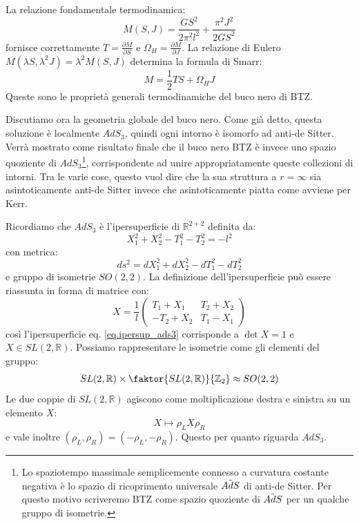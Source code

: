 La relazione fondamentale termodinamica:
\begin{equation}
    M(S,J) = \frac{G S^2}{2\pi^2l^2} + \frac{\pi^2 J^2}{2GS^2}
    \label{eq.rel_fondam_btz}
\end{equation}
fornisce correttamente $T = \frac{\partial M}{\partial S}$ e $\Omega_H = \frac{\partial M}{\partial J}$. La relazione di Eulero $M(\lambda S, \lambda^2 J)=\lambda^2 M(S,J)$ determina la formula di Smarr:
\begin{equation}
    M = \frac{1}{2}TS + \Omega_H J
    \label{eq.smarr_btz}
\end{equation}
Queste sono le proprietà generali termodinamiche del buco nero di BTZ.

Discutiamo ora la geometria globale del buco nero. Come già detto, questa soluzione è localmente $AdS_3$, quindi ogni intorno è isomorfo ad anti-de Sitter. Verrà mostrato come risultato finale che il buco nero BTZ è invece uno spazio quoziente di $AdS_3$\footnote{Lo spaziotempo massimale semplicemente connesso a curvatura costante negativa è lo spazio di ricoprimento universale $\Tilde{AdS}$ di anti-de Sitter. Per questo motivo scriveremo BTZ come spazio quoziente di $\Tilde{AdS}$  per un qualche gruppo di isometrie.}, corrispondente ad unire appropriatamente queste collezioni di intorni.
Tra le varie cose, questo vuol dire che la sua struttura a $r=\infty$ sia asintoticamente anti-de Sitter invece che asintoticamente piatta come avviene per Kerr.

Ricordiamo che $AdS_3$ è l'ipersuperficie di $\mathbb R^{2+2}$ definita da:
\begin{equation}
    X_1^2 + X_2^2 - T_1^2 -T_2^2 = -l^2
    \label{eq.ipersup_ads3}
\end{equation}
con metrica:
\begin{equation*}
    ds^2 = dX_1^2 + dX_2^2 - dT_1^2 - dT_2^2
\end{equation*}
e gruppo di isometrie $SO(2,2)$. La definizione dell'ipersuperficie può essere riassunta in forma di matrice con:
\begin{equation*}
    X = \frac{1}{l}\begin{pmatrix}
        T_1 + X_1 & T_2 + X_2 \\
        -T_2 + X_2 & T_1 - X_1
    \end{pmatrix}
\end{equation*}
così l'ipersuperficie eq. \ref{eq.ipersup_ads3} corrisponde a $\det X = 1$ e $X \in SL(2,\mathbb R)$.
Possiamo rappresentare le isometrie come gli elementi del gruppo:
\begin{equation*}
    SL(2,\mathbb R) \times \faktor{SL(2,\mathbb R)}{\mathbb Z_2} \approx SO(2,2)
\end{equation*}
Le due coppie di $SL(2,\mathbb R)$ agiscono come moltiplicazione destra e sinistra su un elemento $X$:
\begin{equation*}
    X \mapsto \rho_L X \rho_R
\end{equation*}
e vale inoltre $(\rho_L, \rho_R) = (-\rho_L, - \rho_R)$. Questo per quanto riguarda $AdS_3$.


